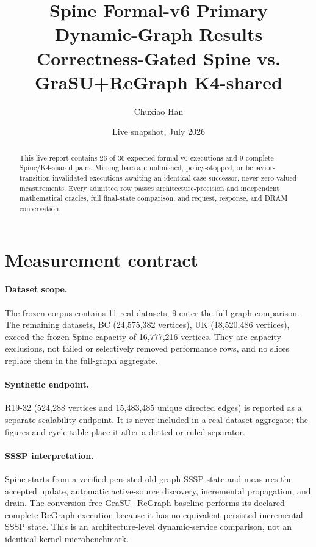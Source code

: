 \documentclass[10pt]{article}
\title{\textbf{Spine Formal-v6 Primary Dynamic-Graph Results}\\
\large Correctness-Gated Spine vs. GraSU+ReGraph K4-shared}
\author{Chuxiao Han}
\date{Live snapshot, July 2026}
\newcommand{\vdatadir}{data/formal_v6_primary}
\newcommand{\vdatadir}{docs/paper/data/formal_v6_primary}
\begin{document}
\maketitle
\begin{abstract}
This live report contains 26 of
36 expected formal-v6 executions and
9 complete Spine/K4-shared pairs. Missing bars are unfinished,
policy-stopped, or behavior-transition-invalidated executions awaiting an
identical-case successor, never zero-valued measurements. Every admitted row
passes architecture-precision and independent mathematical oracles, full
final-state comparison, and request, response, and DRAM conservation.
\end{abstract}

\section{Measurement contract}
\begin{table}[H]
\centering
\small

\caption{Measurement windows observed in admitted formal-v6 rows.}
\end{table}

\paragraph{Dataset scope.}
The frozen corpus contains 11 real datasets;
9 enter the full-graph comparison. The
remaining datasets, BC (24,575,382 vertices), UK (18,520,486 vertices), exceed the frozen Spine capacity of
16,777,216 vertices. They are capacity exclusions,
not failed or selectively removed performance rows, and no slices replace them
in the full-graph aggregate.

\paragraph{Synthetic endpoint.}
R19-32 (524,288 vertices and 15,483,485 unique directed edges) is reported as
a separate scalability endpoint. It is never included in a real-dataset
aggregate; the figures and cycle table place it after a dotted or ruled
separator.

\paragraph{SSSP interpretation.}
Spine starts from a verified persisted old-graph SSSP state and measures the
accepted update, automatic active-source discovery, incremental propagation,
and drain. The conversion-free GraSU+ReGraph baseline performs its declared
complete ReGraph execution because it has no equivalent persisted incremental
SSSP state. This is an architecture-level dynamic-service comparison, not an
identical-kernel microbenchmark.
\end{document}
